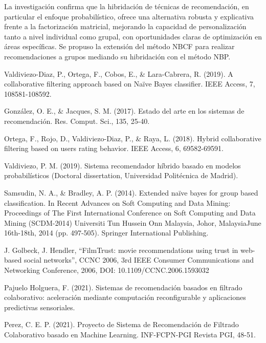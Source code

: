\documentclass[runningheads,a4paper]{llncs}
\begin{document}
La investigación confirma que la hibridación de técnicas de recomendación, en particular el enfoque probabilístico, ofrece una alternativa robusta y explicativa frente a la factorización matricial, mejorando la capacidad de personalización tanto a nivel individual como grupal, con oportunidades claras de optimización en áreas específicas. Se propuso la extensión del método NBCF para realizar recomendaciones a grupos mediando su hibridación con el método NBP.

\renewcommand\refname{Referencias}

\begin{thebibliography}{4}

    Valdiviezo-Diaz, P., Ortega, F., Cobos, E., \& Lara-Cabrera, R. (2019). A collaborative filtering approach based on Naïve Bayes classifier. IEEE Access, 7, 108581-108592.
    
    González, O. E., \& Jacques, S. M. (2017). Estado del arte en los sistemas de recomendación. Res. Comput. Sci., 135, 25-40.
    
    Ortega, F., Rojo, D., Valdiviezo-Diaz, P., \& Raya, L. (2018). Hybrid collaborative filtering based on users rating behavior. IEEE Access, 6, 69582-69591.
    
    Valdiviezo, P. M. (2019). Sistema recomendador híbrido basado en modelos probabilísticos (Doctoral dissertation, Universidad Politécnica de Madrid).

    Samsudin, N. A., \& Bradley, A. P. (2014). Extended naïve bayes for group based classification. In Recent Advances on Soft Computing and Data Mining: Proceedings of The First International Conference on Soft Computing and Data Mining (SCDM-2014) Universiti Tun Hussein Onn Malaysia, Johor, MalaysiaJune 16th-18th, 2014 (pp. 497-505). Springer International Publishing.

    J. Golbeck, J. Hendler, “FilmTrust: movie recommendations using trust in web-based social networks”, CCNC 2006, 3rd IEEE Consumer Communications and Networking Conference, 2006, DOI: 10.1109/CCNC.2006.1593032 

    Pajuelo Holguera, F. (2021). Sistemas de recomendación basados en filtrado colaborativo: aceleración mediante computación reconfigurable y aplicaciones predictivas sensoriales.

    Perez, C. E. P. (2021). Proyecto de Sistema de Recomendación de Filtrado Colaborativo basado en Machine Learning. INF-FCPN-PGI Revista PGI, 48-51.

    
\end{thebibliography}
    
\end{document}
